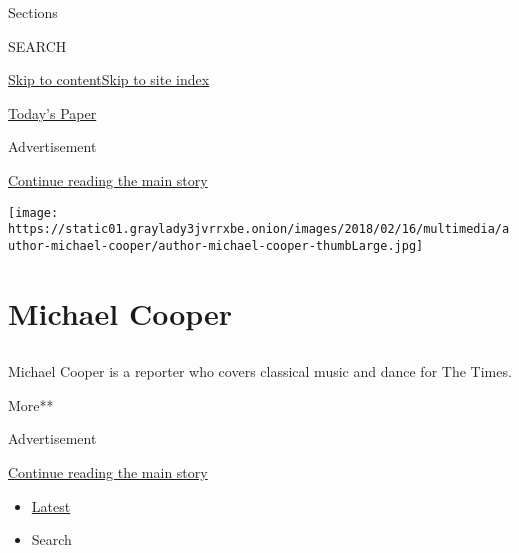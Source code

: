 Sections

SEARCH

\protect\hyperlink{site-content}{Skip to
content}\protect\hyperlink{site-index}{Skip to site index}

\href{https://myaccount.nytimes3xbfgragh.onion/auth/login?response_type=cookie\&client_id=vi}{}

\href{https://www.nytimes3xbfgragh.onion/section/todayspaper}{Today's
Paper}

Advertisement

\protect\hyperlink{after-top}{Continue reading the main story}

\texttt{[image: https://static01.graylady3jvrrxbe.onion/images/2018/02/16/multimedia/author-michael-cooper/author-michael-cooper-thumbLarge.jpg]}

\hypertarget{michael-cooper}{%
\section{Michael Cooper}\label{michael-cooper}}

\subsection{}

Michael Cooper is a reporter who covers classical music and dance for
The Times.

More**

Advertisement

\protect\hyperlink{after-mid1}{Continue reading the main story}

\begin{itemize}
\tightlist
\item
  \protect\hyperlink{stream-panel}{Latest}
\item
  Search
\end{itemize}


